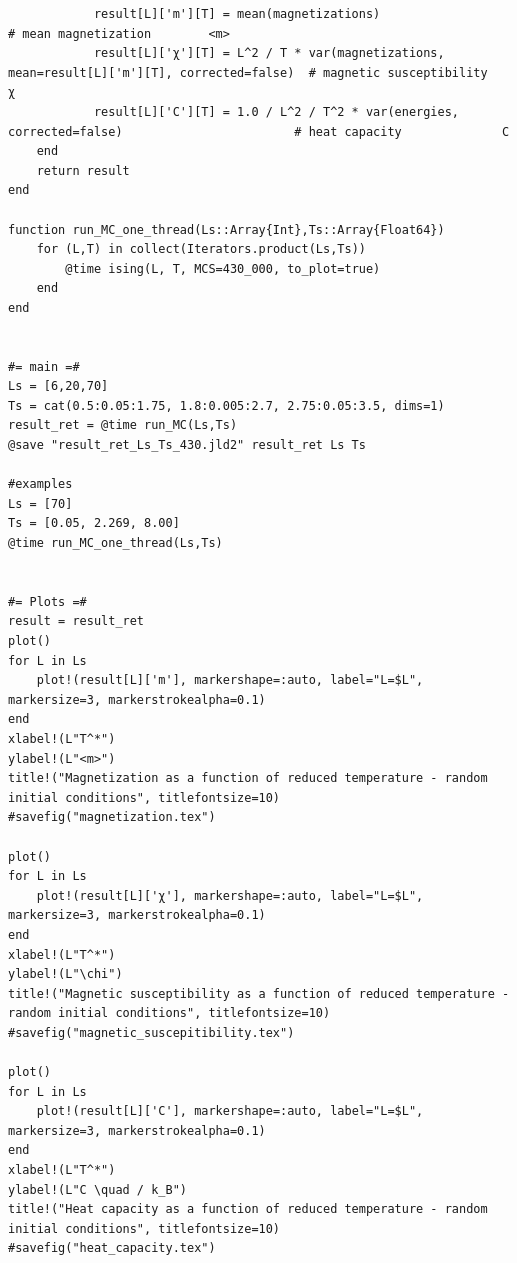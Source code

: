 \documentclass[11pt]{article}
\begin{document}
\begin{verbatim}
            result[L]['m'][T] = mean(magnetizations)                                                    # mean magnetization        <m>
            result[L]['χ'][T] = L^2 / T * var(magnetizations, mean=result[L]['m'][T], corrected=false)  # magnetic susceptibility    χ
            result[L]['C'][T] = 1.0 / L^2 / T^2 * var(energies, corrected=false)                        # heat capacity              C
    end
    return result
end

function run_MC_one_thread(Ls::Array{Int},Ts::Array{Float64})
    for (L,T) in collect(Iterators.product(Ls,Ts))
        @time ising(L, T, MCS=430_000, to_plot=true)
    end
end


#= main =#
Ls = [6,20,70]
Ts = cat(0.5:0.05:1.75, 1.8:0.005:2.7, 2.75:0.05:3.5, dims=1)
result_ret = @time run_MC(Ls,Ts)
@save "result_ret_Ls_Ts_430.jld2" result_ret Ls Ts

#examples
Ls = [70]
Ts = [0.05, 2.269, 8.00]
@time run_MC_one_thread(Ls,Ts)


#= Plots =#
result = result_ret
plot()
for L in Ls
    plot!(result[L]['m'], markershape=:auto, label="L=$L", markersize=3, markerstrokealpha=0.1)
end
xlabel!(L"T^*")
ylabel!(L"<m>")
title!("Magnetization as a function of reduced temperature - random initial conditions", titlefontsize=10)
#savefig("magnetization.tex")

plot()
for L in Ls
    plot!(result[L]['χ'], markershape=:auto, label="L=$L", markersize=3, markerstrokealpha=0.1)
end
xlabel!(L"T^*")
ylabel!(L"\chi")
title!("Magnetic susceptibility as a function of reduced temperature - random initial conditions", titlefontsize=10)
#savefig("magnetic_suscepitibility.tex")

plot()
for L in Ls
    plot!(result[L]['C'], markershape=:auto, label="L=$L", markersize=3, markerstrokealpha=0.1)
end
xlabel!(L"T^*")
ylabel!(L"C \quad / k_B")
title!("Heat capacity as a function of reduced temperature - random initial conditions", titlefontsize=10)
#savefig("heat_capacity.tex")
\end{verbatim}
\end{document}
